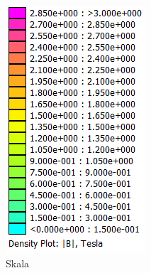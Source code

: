\begin{figure}[h!]
	\centering
	\begin{subfigure}[h]{.28\textwidth}
		\centering
		\includegraphics[width=\textwidth]{data/Skala_nichtlinear}
		\caption{Skala}
		\label{fig:SkalaNonlin}
	\end{subfigure}
	\begin{subfigure}[h]{.60\textwidth}
		\centering

\end{subfigure}
\end{figure}
